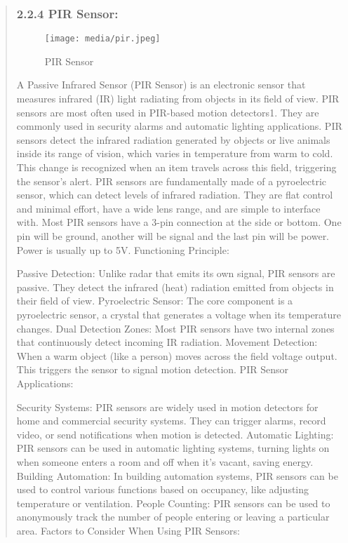 \documentclass[12pt]{report}
\begin{document}
				
				\begin{quote}
				\subsubsection{2.2.4  PIR Sensor:}
				\begin{figure}
					\centering
					\texttt{[image: media/pir.jpeg]}\\
					\caption{PIR Sensor}
				\end{figure}
				A Passive Infrared Sensor (PIR Sensor) is an electronic sensor that measures infrared (IR) light radiating from objects in its field of view. PIR sensors are most often used in PIR-based motion detectors1. They are commonly used in security alarms and automatic lighting applications. PIR sensors detect the infrared radiation generated by objects or live animals inside its range of vision, which varies in temperature from warm to cold. This change is recognized when an item travels across this field, triggering the sensor’s alert. PIR sensors are fundamentally made of a pyroelectric sensor, which can detect levels of infrared radiation. They are flat control and minimal effort, have a wide lens range, and are simple to interface with. Most PIR sensors have a 3-pin connection at the side or bottom. One pin will be ground, another will be signal and the last pin will be power. Power is usually up to 5V.
				Functioning Principle:
				
				Passive Detection: Unlike radar that emits its own signal, PIR sensors are passive. They detect the infrared (heat) radiation emitted from objects in their field of view.
				Pyroelectric Sensor: The core component is a pyroelectric sensor, a crystal that generates a voltage when its temperature changes.
				Dual Detection Zones: Most PIR sensors have two internal zones that continuously detect incoming IR radiation.
				Movement Detection: When a warm object (like a person) moves across the field voltage output. This triggers the sensor to signal motion detection.
				PIR Sensor Applications:
				
				Security Systems: PIR sensors are widely used in motion detectors for home and commercial security systems. They can trigger alarms, record video, or send notifications when motion is detected.
				Automatic Lighting: PIR sensors can be used in automatic lighting systems, turning lights on when someone enters a room and off when it's vacant, saving energy.
				Building Automation: In building automation systems, PIR sensors can be used to control various functions based on occupancy, like adjusting temperature or ventilation.
				People Counting: PIR sensors can be used to anonymously track the number of people entering or leaving a particular area.
				Factors to Consider When Using PIR Sensors:
				

\end{quote}
\end{document}
